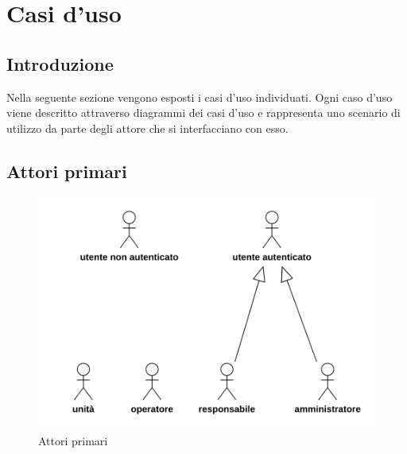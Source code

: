 \section{Casi d'uso}
\subsection{Introduzione}
Nella seguente sezione vengono esposti i casi d'uso individuati. Ogni caso d'uso viene descritto attraverso diagrammi dei casi d'uso e rappresenta uno scenario di utilizzo da parte degli attore che si interfacciano con esso.
\subsection{Attori primari}
\begin{figure}[H]
	\centering
	\includegraphics[scale=0.75]{res/images/gerarchia.png}
	\caption{Attori primari}
\end{figure}
